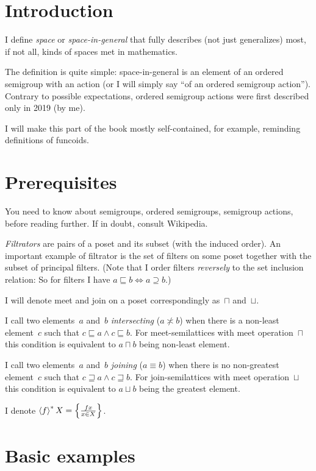 \chapter{Introduction}

I define \emph{space} or \emph{space-in-general} that fully describes (not just generalizes) most, if not all, kinds of spaces met in mathematics.

The definition is quite simple: space-in-general is an element of an ordered semigroup with an action
(or I will simply say ``of an ordered semigroup action''). Contrary to possible expectations, ordered semigroup actions were first described only in 2019 (by me).

I will make this part of the book mostly self-contained, for example, reminding definitions of funcoids.

\chapter{Prerequisites}

You need to know about semigroups, ordered semigroups, semigroup actions, before reading further. If in doubt, consult Wikipedia.

\emph{Filtrators} are pairs of a poset and its subset (with the induced order). An important example of filtrator is the set of filters on some poset together with the subset of principal filters. (Note that I order filters \emph{reversely} to the set inclusion relation: So for filters I have $a\sqsubseteq b \Leftrightarrow a\supseteq b$.)

I will denote meet and join on a poset correspondingly as~$\sqcap$ and~$\sqcup$.

I call two elements~$a$ and~$b$ \emph{intersecting} ($a\nasymp b$) when there is a non-least element~$c$ such that $c\sqsubseteq a\land c\sqsubseteq b$. For	 meet-semilattices with meet operation~$\sqcap$ this condition is equivalent to $a\sqcap b$ being non-least element.

I call two elements~$a$ and~$b$ \emph{joining} ($a\equiv b$) when there is no non-greatest element~$c$ such that $c\sqsupseteq a\land c\sqsupseteq b$. For join-semilattices with meet operation~$\sqcup$ this condition is equivalent to $a\sqcup b$ being the greatest element.

I denote $\left\langle f\right\rangle ^{\ast}X = \left\{ \frac{fx}{x\in X}\right\}$.

\chapter{Basic examples}

